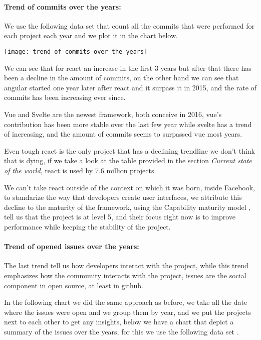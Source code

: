 \paragraph{Trend of commits over the years:} 

We use the following data set \cite{trend-of-commits-over-the-years} that count all the commits that were performed for each project each year and we plot it in the chart below.
\begin{center}
    \texttt{[image: trend-of-commits-over-the-years]}    
\end{center}

We can see that for react an increase in the first 3 years but after that there has been a decline in the amount of commits, on the other hand we can see that angular started one year later after react and it surpass it in 2015, and the rate of commits has been increasing ever since.

Vue and Svelte are the newest framework, both conceive in 2016, vue's contribution has been more stable over the last few year while svelte has a trend of increasing, and the amount of commits seems to surpassed vue most years.

Even tough react is the only project that has a declining trendline we don't think that is dying, if we take a look at the table provided in the section \textit{Current state of the world}, react is used by 7.6 million projects.

We can't take react outside of the context on which it was born, inside Facebook, to standarize the way that developers create user interfaces, we attribute this decline to the maturity of the framework, using the Capability maturity model \cite{cmm}, tell us that the project is at level 5, and their focus right now is to improve performance while keeping the stability of the project.

\paragraph{Trend of opened issues over the years: }
The last trend tell us how developers interact with the project, while this trend emphasizes how the community interacts with the project, issues are the social component in open source, at least in github.

In the following chart we did the same approach as before, we take all the date where the issues were open and we group them by year, and we put the projects next to each other to get any insights, below we have a chart that depict a summary of the issues over the years, for this we use the following data set \cite{trend-of-open-issues-over-the-years}.

